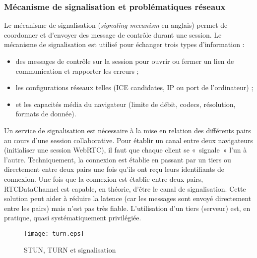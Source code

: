 \subsubsection{Mécanisme de signalisation et problématiques réseaux}
Le mécanisme de signalisation (\textit{signaling mecanism} en anglais) 
permet de coordonner et d'envoyer des message de contrôle durant une 
session. Le mécanisme de signalisation est utilisé pour échanger trois 
types d'information : 
\begin{itemize}
	\item des messages de contrôle sur la session pour ouvrir ou fermer un 
	lien de communication et rapporter les erreurs ;
	\item les configurations réseaux telles (ICE candidates, IP ou
	port de l'ordinateur) ; 
	\item et les capacités média du navigateur (limite de débit, codecs, 
	résolution, formats de donnée).
\end{itemize}
Un service de signalisation est nécessaire à la mise en relation des 
différents pairs au cours d'une session collaborative. 
Pour établir un canal entre deux navigateurs (initialiser une session 
WebRTC), il faut que chaque client se «~signale~» l'un à l'autre. 
Techniquement, la connexion est établie en passant par 
un tiers ou directement entre deux pairs une fois qu'ils ont reçu leurs 
identifiants de connexion. 
Une fois que la connexion est établie entre deux pairs, 
RTCDataChannel est capable, en théorie, d'être le canal de signalisation. 
Cette solution peut aider à réduire la latence (car les messages sont 
envoyé directement entre les pairs) mais n'est pas très fiable. L'utilisation 
d'un tiers (serveur) est, en pratique, quasi systématiquement privilégiée.

\begin{figure}[hbt]
	\centering
	\texttt{[image: turn.eps]}
	\caption{STUN, TURN et signalisation}
	\label{fig:turn}
\end{figure} 

